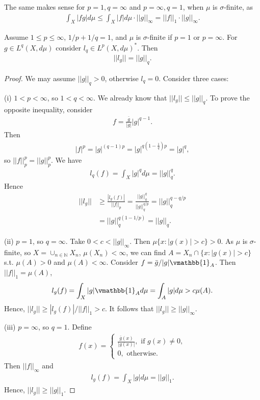 The same makes sense for \(p=1, q=\infty\) and \(p=\infty, q= 1\), when \(\mu\) is \(\sigma\)-finite, as
\begin{align*}
    \int_X |fg|d\mu\leq \int_X|f|d\mu \cdot ||g||_{\infty} = ||f||_1\cdot ||g||_{\infty}.
\end{align*}
\begin{lemma}
    Assume \(1\leq p\leq \infty\), \(1/p+1/q=1\), and \(\mu\) is \(\sigma\)-finite if \(p=1\) or \(p=\infty\). For \(g\in L^q(X,d\mu)\) consider \(l_q \in L^p(X,d\mu)^*\). Then 
    \begin{align*}
        ||l_g|| = ||g||_q.
    \end{align*}
\end{lemma}
\ifdetailed
\begin{proof}
    We may assume \(||g||_q>0\), otherwise \(l_q=0\). Consider three cases:

    (i) \(1<p<\infty\), so \(1<q<\infty\). We already know that \(||l_g||\leq ||g||_q\). To prove the opposite inequality, consider
    \begin{align*}
        f = \frac{\bar{g}}{|g|} |g|^{q-1}.
    \end{align*}
    Then
    \begin{align*}
        |f|^p = |g|^{(q-1)p} = |g|^{q(1-\frac{1}{q})p} = |g|^q,
    \end{align*}
    so \(||f||_{p}^{p}= ||g||_{p}^{p}\). We have 
    \begin{align*}
        l_q(f) = \int_X|g|^qd\mu = ||g||^{q}_{q}.
    \end{align*}
    Hence
    \begin{align*}
        ||l_g||&\geq \frac{|l_g(f)|}{||f||_p} = \frac{||g||^{q}_{q}}{||g||_{q}^{q/p}} = ||g||_{q}^{q-q/p} \\
        &= ||g||_{q}^{q(1-1/p)} = ||g||_q.
    \end{align*}

    (ii) \(p=1\), so \(q=\infty\). Take \(0<c<||g||_{\infty}\). Then \(\mu\{x:|g(x)|>c\} > 0\). As \(\mu\) is \(\sigma\)-finite, so \(X=\cup_{n\in\mathbb{N}}X_n\), \(\mu(X_n)<\infty\), we can find \(A=X_n\cap \{x:|g(x)|>c\}\) s.t. \(\mu(A)>0\) and \(\mu(A)<\infty\). Consider \(f= \bar{g}/|g|\vmathbb{1}_A\). Then \(||f||_1= \mu(A)\),
    \begin{align*}
        l_g(f) = \int_X |g|\vmathbb{1}_A d\mu = \int_A|g|d\mu>c\mu(A).
    \end{align*}
    Hence, \(||l_g||\geq |l_g(f)|/||f||_1>c\). It follows that \(||l_g||\geq ||g||_{\infty}\).

    (iii) \(p=\infty\), so \(q=1\). Define
    \begin{align*}
        f(x) = \begin{cases}
            \frac{\bar{g}(x)}{|g(x)|}, \text{ if } g(x) \neq 0, \\
            0, \text{ otherwise}.
        \end{cases}
    \end{align*}
    Then \(||f||_{\infty}\) and
    \begin{align*}
        l_g(f) = \int_X|g|d\mu = ||g||_1.
    \end{align*}
    Hence, \(||l_g||\geq||g||_1\).
\end{proof}
